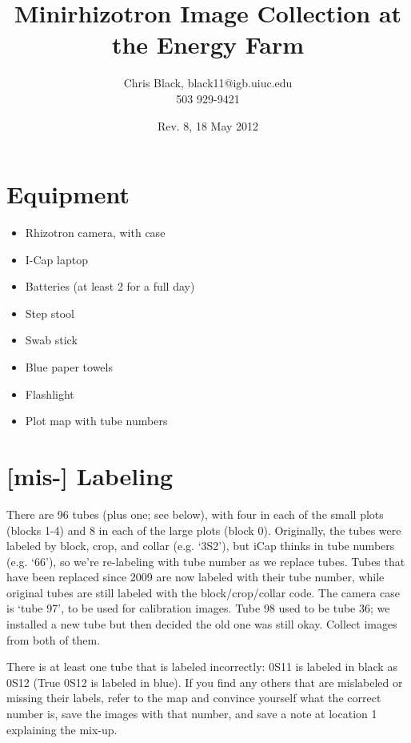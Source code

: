\documentclass[11pt]{article}
\title{Minirhizotron Image Collection at the Energy Farm}
\author{Chris Black, black11@igb.uiuc.edu\\503 929-9421}
\date{Rev. 8, 18 May 2012}
\begin{document}
\maketitle


\section{Equipment}
	\begin{itemize}
		\item{Rhizotron camera, with case}
		\item{I-Cap laptop}
		\item{Batteries (at least 2 for a full day)}	
		\item{Step stool}
		\item{Swab stick}
		\item{Blue paper towels}
		\item{Flashlight}
		\item{Plot map with tube numbers}
	\end{itemize}

	
\section{[mis-] Labeling} 
	There are 96 tubes (plus one; see below), with four in each of the small plots (blocks 1-4) and 8 in each of the large plots (block 0). Originally, the tubes were labeled by block, crop, and collar (e.g. `3S2'), but iCap thinks in tube numbers (e.g. `66'), so we're re-labeling with tube number as we replace tubes. Tubes that have been replaced since 2009 are now labeled with their tube number, while original tubes are still labeled with the block/crop/collar code. The camera case is `tube 97', to be used for calibration images. Tube 98 used to be tube 36; we installed a new tube but then decided the old one was still okay. Collect images from both of them.
	
	There is at least one tube that is labeled incorrectly: 0S11 is labeled in black as 0S12 (True 0S12 is labeled in blue). If you find any others that are mislabeled or missing their labels, refer to the map and convince yourself what the correct number is, save the images with that number, and save a note at location 1 explaining the mix-up.
\end{document}
